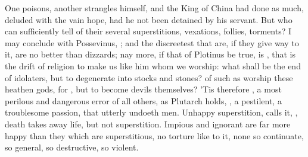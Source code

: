 {One poisons, another strangles himself, and the King of China had done
as much, deluded with the vain hope, had he not been detained by his
servant. But who can sufficiently tell of their several superstitions,
vexations, follies, torments? I may conclude with Possevinus,
; and the discreetest that are, if they give way to it,
are no better than dizzards; nay more, if that of Plotinus be true, is
, that is the
drift of religion to make us like him whom we worship: what shall be
the end of idolaters, but to degenerate into stocks and stones? of such
as worship these heathen gods, for , but to
become devils themselves? 'Tis therefore , a most perilous and dangerous error of all others, as
Plutarch holds, , a
pestilent, a troublesome passion, that utterly undoeth men. Unhappy
superstition, \Pliny{} calls it, , death takes away
life, but not superstition. Impious and ignorant are far more happy
than they which are superstitious, no torture like to it, none so
continuate, so general, so destructive, so violent.

}

